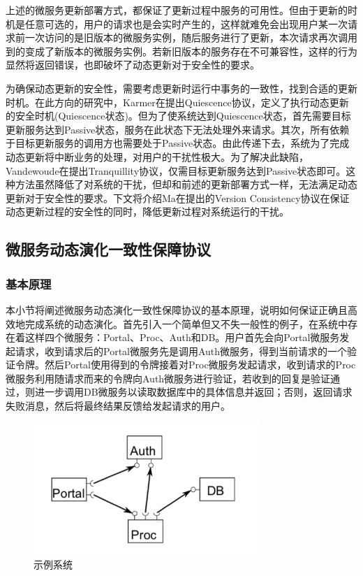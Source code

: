 \documentclass[a4paper, 12pt]{article}
\theoremstyle{definition}
\begin{document}
上述的微服务更新部署方式，都保证了更新过程中服务的可用性。但由于更新的时机是任意可选的，用户的请求也是会实时产生的，这样就难免会出现用户某一次请求前一次访问的是旧版本的微服务实例，随后服务进行了更新，本次请求再次调用到的变成了新版本的微服务实例。若新旧版本的服务存在不可兼容性，这样的行为显然将返回错误，也即破坏了动态更新对于安全性的要求。

为确保动态更新的安全性，需要考虑更新时运行中事务的一致性，找到合适的更新时机。在此方向的研究中，Karmer在\cite{Quiescence,1996Dynamic}提出Quiescence协议，定义了执行动态更新的安全时机(Quiescence状态)。但为了使系统达到Quiescence状态，首先需要目标更新服务达到Passive状态，服务在此状态下无法处理外来请求。其次，所有依赖于目标更新服务的调用方也需要处于Passive状态。由此传递下去，系统为了完成动态更新将中断业务的处理，对用户的干扰性极大。为了解决此缺陷，Vandewoude在\cite{2007Tranquility}提出Tranquillity协议，仅需目标更新服务达到Passive状态即可。这种方法虽然降低了对系统的干扰，但却和前述的更新部署方式一样，无法满足动态更新对于安全性的要求。下文将介绍Ma在\cite{Ma2011Version}提出的Version Consistency协议在保证动态更新过程的安全性的同时，降低更新过程对系统运行的干扰。

\newpage
\subsection{微服务动态演化一致性保障协议}\label{section:version_consistency}

\subsubsection{基本原理}
本小节将阐述微服务动态演化一致性保障协议的基本原理，说明如何保证正确且高效地完成系统的动态演化。首先引入一个简单但又不失一般性的例子，在系统中存在着这样四个微服务：Portal、Proc、Auth和DB。用户首先会向Portal微服务发起请求，收到请求后的Portal微服务先是调用Auth微服务，得到当前请求的一个验证令牌。然后Portal使用得到的令牌接着对Proc微服务发起请求，收到请求的Proc微服务利用随请求而来的令牌向Auth微服务进行验证，若收到的回复是验证通过，则进一步调用DB微服务以读取数据库中的具体信息并返回；否则，返回请求失败消息，然后将最终结果反馈给发起请求的用户。
\begin{figure}[!ht]
 \centering
 \includegraphics[height=5cm]{images/Example.png}
 \caption{示例系统}
 \label{fig:Example}
\end{figure}
\end{document}
